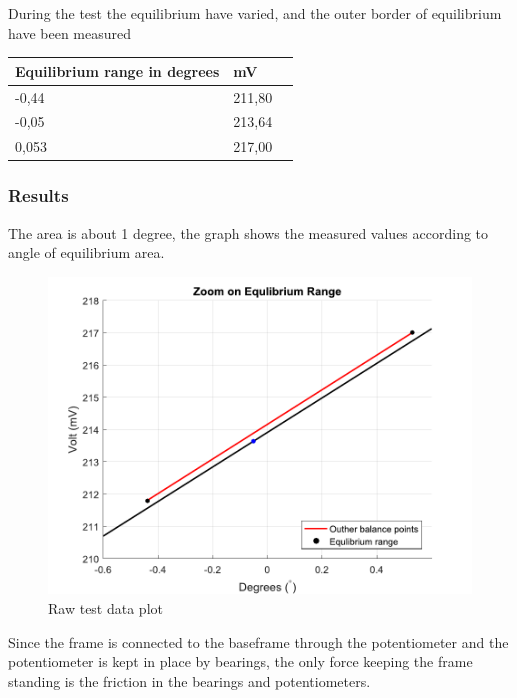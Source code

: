 During the test the equilibrium have varied, and the outer border of equilibrium have been measured 

\begin{table}[H]
	\begin{tabular}{|l|l|p{4.3cm}|}
		\hline%
		\textbf{Equilibrium range in degrees}       &  \textbf{mV}         \\
		\hline%
		-0,44                               			  & 211,80               \\
		\hline%
		-0,05                                          & 213,64               \\
		\hline%
		0,053 										  & 217,00              \\
		\hline%
	\end{tabular}
\end{table}

\subsubsection{Results}
The area is about 1 degree, the graph shows the measured values according to angle of equilibrium area.
\begin{figure}[H] 
	\centering 
	\includegraphics[scale=0.7]{figures/linearityOfPotmeterTest2-2}
	\caption{Raw test data plot}
	\label{linearityOfPotmeterTest2-2}
\end{figure}
Since the frame is connected to the baseframe through the potentiometer and the potentiometer is kept in place by bearings, the only force keeping the frame standing is the friction in the bearings and potentiometers.



